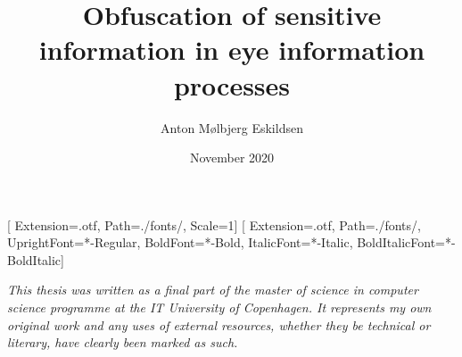 \documentclass[11pt, a4paper, twoside]{report}
\title{Obfuscation of sensitive information in eye information processes}
\author{Anton Mølbjerg Eskildsen}
\date{November 2020}
\begin{document}
[
Extension={.otf},
Path=./fonts/,
Scale=1]
\setmainfont{STIX2Text}[
Extension={.otf},
Path=./fonts/,
UprightFont={*-Regular},
BoldFont={*-Bold},
ItalicFont={*-Italic},
BoldItalicFont={*-BoldItalic}]

\maketitle

\tableofcontents

\newpage
\begin{center}
\emph{This thesis was written as a final part of the master of science in computer science programme at the IT University of Copenhagen. It represents my own original work and any uses of external resources, whether they be technical or literary, have clearly been marked as such.}
\end{center}
\newpage

















\printbibliography

\newpage

\printnoidxglossaries
\printnomenclature[1in]

\newpage

\end{document}
